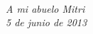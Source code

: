 \ \vspace{3cm}
\begin{flushright}
	{\em A mi abuelo Mitri }\\
	{\em 5 de junio de 2013 }
\end{flushright}

